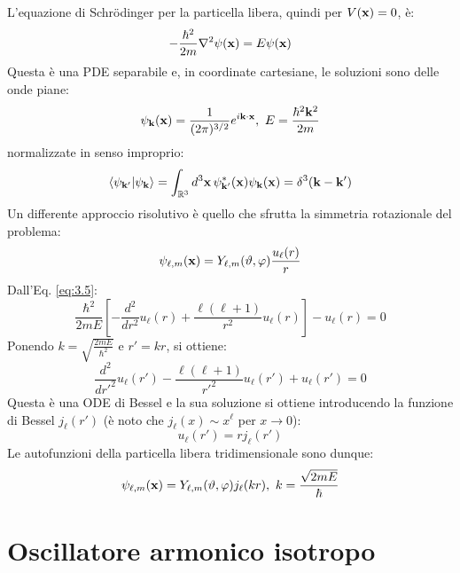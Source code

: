 L'equazione di Schrödinger per la particella libera, quindi per $ V(\mathbf{x}) = 0 $, è:
\begin{equation}
	-\frac{\hbar^2}{2m} \nabla^2 \psi(\mathbf{x}) = E \psi(\mathbf{x})
	\label{eq:3.12}
\end{equation}
Questa è una PDE separabile e, in coordinate cartesiane, le soluzioni sono delle onde piane:
\begin{equation}
	\psi_{\mathbf{k}}(\mathbf{x}) = \frac{1}{(2\pi)^{3/2}} e^{i \mathbf{k}\cdot\mathbf{x}}, \,\, E = \frac{\hbar^2 \mathbf{k}^2}{2m}
	\label{eq:3.13}
\end{equation}
normalizzate in senso improprio:
\begin{equation}
	\braket{\psi_{\mathbf{k}'} | \psi_{\mathbf{k}}} = \int_{\mathbb{R}^3} d^3\mathbf{x}\, \psi^*_{\mathbf{k}'}(\mathbf{x}) \psi_{\mathbf{k}}(\mathbf{x}) = \delta^3(\mathbf{k} - \mathbf{k}')
	\label{eq:3.14}
\end{equation}
Un differente approccio risolutivo è quello che sfrutta la simmetria rotazionale del problema:
\begin{equation}
	\psi_{\ell,m}(\mathbf{x}) = Y_{\ell,m}(\vartheta,\varphi) \frac{u_{\ell}(r)}{r}
	\label{eq:3.15}
\end{equation}
Dall'Eq. \ref{eq:3.5}:
\begin{equation}
	\frac{\hbar^2}{2mE} \left[ -\frac{d^2}{dr^2}u_{\ell}(r) + \frac{\ell(\ell + 1)}{r^2}u_{\ell}(r) \right] - u_{\ell}(r) = 0
	\label{eq:3.16}
\end{equation}
Ponendo $ k = \sqrt{\frac{2mE}{\hbar^2}} $ e $ r' = kr $, si ottiene:
\begin{equation}
	\frac{d^2}{dr'^2} u_{\ell}(r') - \frac{\ell(\ell + 1)}{r'^2} u_{\ell}(r') + u_{\ell}(r') = 0
	\label{eq:3.17}
\end{equation}
Questa è una ODE di Bessel e la sua soluzione si ottiene introducendo la funzione di Bessel $ j_{\ell}(r') $ (è noto che $ j_{\ell}(x) \sim x^{\ell} $ per $ x \rightarrow 0 $):
\begin{equation}
	u_{\ell}(r') = r j_{\ell}(r')
	\label{eq:3.18}
\end{equation}
Le autofunzioni della particella libera tridimensionale sono dunque:
\begin{equation}
	\psi_{\ell,m}(\mathbf{x}) = Y_{\ell,m}(\vartheta,\varphi) j_{\ell}(kr), \,\, k = \frac{\sqrt{2mE}}{\hbar}
	\label{eq:3.19}
\end{equation}

\section{Oscillatore armonico isotropo}

